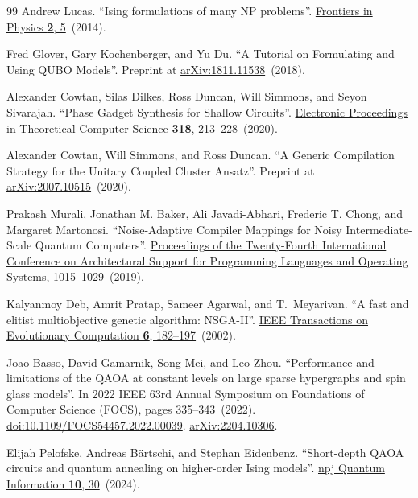 \documentclass[a4paper,onecolumn,11pt,unpublished]{quantumarticle}
\theoremstyle{remark}
\begin{document}
\begin{thebibliography}{99}
Andrew Lucas.
\newblock ``Ising formulations of many NP problems''.
\newblock \href{https://doi.org/10.3389/fphy.2014.00005}{Frontiers in Physics {\bf 2}, 5}~(2014).


Fred Glover, Gary Kochenberger, and Yu Du.
\newblock ``A Tutorial on Formulating and Using QUBO Models''.
\newblock Preprint at \href{https://arxiv.org/abs/1811.11538}{arXiv:1811.11538}~(2018).


Alexander Cowtan, Silas Dilkes, Ross Duncan, Will Simmons, and Seyon Sivarajah.
\newblock ``Phase Gadget Synthesis for Shallow Circuits''.
\newblock \href{https://doi.org/10.4204/eptcs.318.13}{Electronic Proceedings in Theoretical Computer Science {\bf 318}, 213--228}~(2020).


Alexander Cowtan, Will Simmons, and Ross Duncan.
\newblock ``A Generic Compilation Strategy for the Unitary Coupled Cluster Ansatz''.
\newblock Preprint at \href{https://arxiv.org/abs/2007.10515}{arXiv:2007.10515}~(2020).


Prakash Murali, Jonathan M. Baker, Ali Javadi-Abhari, Frederic T. Chong, and Margaret Martonosi.
\newblock ``Noise-Adaptive Compiler Mappings for Noisy Intermediate-Scale Quantum Computers''.
\newblock \href{https://doi.org/10.1145/3297858.3304075}{Proceedings of the Twenty-Fourth International Conference on Architectural Support for Programming Languages and Operating Systems, 1015--1029}~(2019).


Kalyanmoy Deb, Amrit Pratap, Sameer Agarwal, and T.~Meyarivan.
\newblock ``A fast and elitist multiobjective genetic algorithm: NSGA-II''.
\newblock \href{https://dx.doi.org/10.1109/4235.996017}{IEEE Transactions on Evolutionary Computation {\bf 6}, 182--197}~(2002).

Joao Basso, David Gamarnik, Song Mei, and Leo Zhou.
\newblock ``Performance and limitations of the QAOA at constant levels on large sparse hypergraphs and spin glass models''.
\newblock In 2022 IEEE 63rd Annual Symposium on Foundations of Computer Science (FOCS), pages 335--343~(2022).
\newblock \href{https://dx.doi.org/10.1109/FOCS54457.2022.00039}{doi:10.1109/FOCS54457.2022.00039}.
\newblock \href{http://arxiv.org/abs/2204.10306}{arXiv:2204.10306}.

Elijah Pelofske, Andreas B{\"a}rtschi, and Stephan Eidenbenz.
\newblock ``Short-depth QAOA circuits and quantum annealing on higher-order Ising models''.
\newblock \href{https://dx.doi.org/10.1038/s41534-024-00825-w}{npj Quantum Information {\bf 10}, 30}~(2024).


\end{thebibliography}
\end{document}
